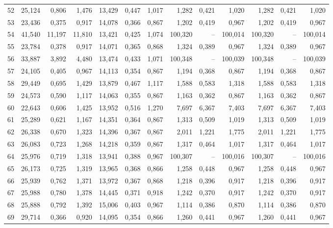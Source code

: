 \begin{longtable}{lrrrrrrrrrrrr}
52 & 25,124 & 0,806 & 1,476 & 13,429 & 0,447 & 1,017 & 1,282 & 0,421 & 1,020 & 1,282 & 0,421 & 1,020 \\
53 & 23,436 & 0,375 & 0,917 & 14,078 & 0,366 & 0,867 & 1,202 & 0,419 & 0,967 & 1,202 & 0,419 & 0,967 \\
54 & 41,540 & 11,197 & 11,810 & 13,421 & 0,425 & 1,074 & 100,320 & -- & 100,014 & 100,320 & -- & 100,014 \\
55 & 23,784 & 0,378 & 0,917 & 14,071 & 0,365 & 0,868 & 1,324 & 0,389 & 0,967 & 1,324 & 0,389 & 0,967 \\
56 & 33,887 & 3,892 & 4,480 & 13,474 & 0,433 & 1,071 & 100,348 & -- & 100,039 & 100,348 & -- & 100,039 \\
57 & 24,105 & 0,405 & 0,967 & 14,113 & 0,354 & 0,867 & 1,194 & 0,368 & 0,867 & 1,194 & 0,368 & 0,867 \\
58 & 29,449 & 0,695 & 1,429 & 13,879 & 0,467 & 1,117 & 1,588 & 0,583 & 1,318 & 1,588 & 0,583 & 1,318 \\
59 & 24,573 & 0,590 & 1,117 & 14,063 & 0,355 & 0,867 & 1,163 & 0,362 & 0,867 & 1,163 & 0,362 & 0,867 \\
60 & 22,643 & 0,606 & 1,425 & 13,952 & 0,516 & 1,270 & 7,697 & 6,367 & 7,403 & 7,697 & 6,367 & 7,403 \\
61 & 25,289 & 0,621 & 1,167 & 14,351 & 0,364 & 0,867 & 1,313 & 0,509 & 1,019 & 1,313 & 0,509 & 1,019 \\
62 & 26,338 & 0,670 & 1,323 & 14,396 & 0,367 & 0,867 & 2,011 & 1,221 & 1,775 & 2,011 & 1,221 & 1,775 \\
63 & 26,083 & 0,723 & 1,268 & 14,218 & 0,359 & 0,867 & 1,317 & 0,464 & 1,017 & 1,317 & 0,464 & 1,017 \\
64 & 25,976 & 0,719 & 1,318 & 13,941 & 0,388 & 0,967 & 100,307 & -- & 100,016 & 100,307 & -- & 100,016 \\
65 & 26,173 & 0,725 & 1,319 & 13,965 & 0,368 & 0,866 & 1,258 & 0,448 & 0,967 & 1,258 & 0,448 & 0,967 \\
66 & 25,939 & 0,762 & 1,371 & 13,972 & 0,367 & 0,868 & 1,218 & 0,396 & 0,917 & 1,218 & 0,396 & 0,917 \\
67 & 25,988 & 0,780 & 1,378 & 14,445 & 0,371 & 0,918 & 1,242 & 0,370 & 0,917 & 1,242 & 0,370 & 0,917 \\
68 & 25,888 & 0,792 & 1,392 & 15,006 & 0,403 & 0,967 & 1,114 & 0,386 & 0,870 & 1,114 & 0,386 & 0,870 \\
69 & 29,714 & 0,366 & 0,920 & 14,095 & 0,354 & 0,866 & 1,260 & 0,441 & 0,967 & 1,260 & 0,441 & 0,967 \\

\end{longtable}
